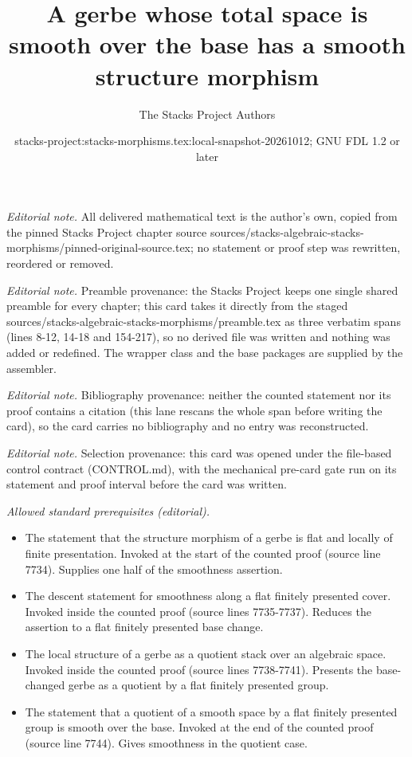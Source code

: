 \documentclass[10pt,a4paper]{amsart}
\title{A gerbe whose total space is smooth over the base has a smooth structure morphism}
\author{The Stacks Project Authors}
\date{stacks-project:stacks-morphisms.tex:local-snapshot-20261012; GNU FDL 1.2 or later}
\theoremstyle{plain}
\theoremstyle{definition}
\theoremstyle{remark}
\numberwithin{equation}{subsection}
\begin{document}
\maketitle
\noindent\textit{Editorial note.} All delivered mathematical text is the author's own, copied from the pinned Stacks Project chapter source sources/stacks-algebraic-stacks-morphisms/pinned-original-source.tex; no statement or proof step was rewritten, reordered or removed.\par\medskip
\noindent\textit{Editorial note.} Preamble provenance: the Stacks Project keeps one single shared preamble for every chapter; this card takes it directly from the staged sources/stacks-algebraic-stacks-morphisms/preamble.tex as three verbatim spans (lines 8-12, 14-18 and 154-217), so no derived file was written and nothing was added or redefined. The wrapper class and the base packages are supplied by the assembler.\par\medskip
\noindent\textit{Editorial note.} Bibliography provenance: neither the counted statement nor its proof contains a citation (this lane rescans the whole span before writing the card), so the card carries no bibliography and no entry was reconstructed.\par\medskip
\noindent\textit{Editorial note.} Selection provenance: this card was opened under the file-based control contract (CONTROL.md), with the mechanical pre-card gate run on its statement and proof interval before the card was written.\par\medskip
\noindent\textit{Allowed standard prerequisites (editorial).}\begin{itemize}
\item The statement that the structure morphism of a gerbe is flat and locally of finite presentation. Invoked at the start of the counted proof (source line 7734). Supplies one half of the smoothness assertion.
\item The descent statement for smoothness along a flat finitely presented cover. Invoked inside the counted proof (source lines 7735-7737). Reduces the assertion to a flat finitely presented base change.
\item The local structure of a gerbe as a quotient stack over an algebraic space. Invoked inside the counted proof (source lines 7738-7741). Presents the base-changed gerbe as a quotient by a flat finitely presented group.
\item The statement that a quotient of a smooth space by a flat finitely presented group is smooth over the base. Invoked at the end of the counted proof (source line 7744). Gives smoothness in the quotient case.
\end{itemize}\medskip
\end{document}
